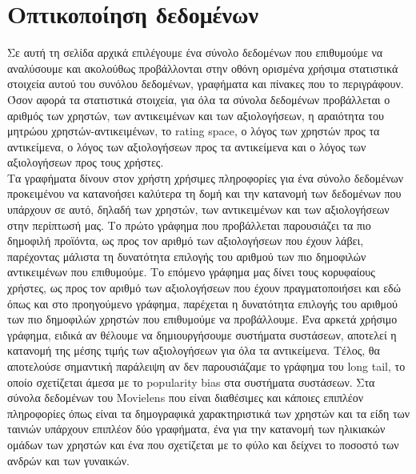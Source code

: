 \section{Οπτικοποίηση δεδομένων}
\noindent Σε αυτή τη σελίδα αρχικά επιλέγουμε ένα σύνολο δεδομένων που επιθυμούμε να αναλύσουμε και ακολούθως προβάλλονται στην οθόνη ορισμένα χρήσιμα στατιστικά στοιχεία αυτού του συνόλου δεδομένων, γραφήματα και πίνακες που το περιγράφουν. Όσον αφορά τα στατιστικά στοιχεία, για όλα τα σύνολα δεδομένων προβάλλεται ο αριθμός των χρηστών, των αντικειμένων και των αξιολογήσεων, η αραιότητα του μητρώου χρηστών-αντικειμένων, το rating space, ο λόγος των χρηστών προς τα αντικείμενα, ο λόγος των αξιολογήσεων προς τα αντικείμενα και ο λόγος των αξιολογήσεων προς τους χρήστες.\\
Τα γραφήματα δίνουν στον χρήστη χρήσιμες πληροφορίες για ένα σύνολο δεδομένων προκειμένου να κατανοήσει καλύτερα τη δομή και την κατανομή των δεδομένων που υπάρχουν σε αυτό, δηλαδή των χρηστών, των αντικειμένων και των αξιολογήσεων στην περίπτωσή μας. Το πρώτο γράφημα που προβάλλεται παρουσιάζει τα πιο δημοφιλή προϊόντα, ως προς τον αριθμό των αξιολογήσεων που έχουν λάβει, παρέχοντας μάλιστα τη δυνατότητα επιλογής του αριθμού των πιο δημοφιλών αντικειμένων που επιθυμούμε. Το επόμενο γράφημα μας δίνει τους κορυφαίους χρήστες, ως προς τον αριθμό των αξιολογήσεων που έχουν πραγματοποιήσει και εδώ όπως και στο προηγούμενο γράφημα, παρέχεται η δυνατότητα επιλογής του αριθμού των πιο δημοφιλών χρηστών που επιθυμούμε να προβάλλουμε. Ένα αρκετά χρήσιμο γράφημα, ειδικά αν θέλουμε να δημιουργήσουμε συστήματα συστάσεων, αποτελεί η κατανομή της μέσης τιμής των αξιολογήσεων για όλα τα αντικείμενα. Τέλος, θα αποτελούσε σημαντική παράλειψη αν δεν παρουσιάζαμε το γράφημα του long tail, το οποίο σχετίζεται άμεσα με το popularity bias στα συστήματα συστάσεων. Στα σύνολα δεδομένων του Movielens που είναι διαθέσιμες και κάποιες επιπλέον πληροφορίες όπως είναι τα δημογραφικά χαρακτηριστικά των χρηστών και τα είδη των ταινιών υπάρχουν επιπλέον δύο γραφήματα, ένα για την κατανομή των ηλικιακών ομάδων των χρηστών και ένα που σχετίζεται με το φύλο και δείχνει το ποσοστό των ανδρών και των γυναικών.
\newpage
